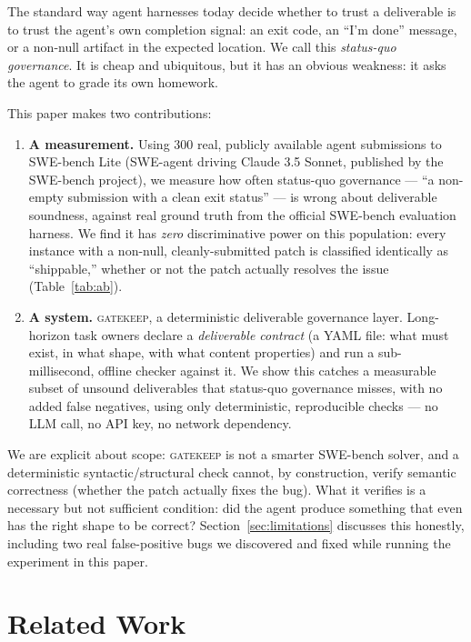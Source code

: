 \documentclass{article}
\begin{document}
The standard way agent harnesses today decide whether to trust a
deliverable is to trust the agent's own completion signal: an exit code,
an ``I'm done'' message, or a non-null artifact in the expected location.
We call this \emph{status-quo governance}. It is cheap and ubiquitous, but
it has an obvious weakness: it asks the agent to grade its own homework.

This paper makes two contributions:

\begin{enumerate}
  \item \textbf{A measurement.} Using 300 real, publicly available agent
  submissions to SWE-bench Lite (SWE-agent driving Claude 3.5 Sonnet,
  published by the SWE-bench project), we measure how often status-quo
  governance --- ``a non-empty submission with a clean exit status'' ---
  is wrong about deliverable soundness, against real ground truth from the
  official SWE-bench evaluation harness. We find it has \emph{zero}
  discriminative power on this population: every instance with a non-null,
  cleanly-submitted patch is classified identically as ``shippable,''
  whether or not the patch actually resolves the issue (Table~\ref{tab:ab}).

  \item \textbf{A system.} \textsc{gatekeep}, a deterministic deliverable
  governance layer. Long-horizon task owners declare a \emph{deliverable
  contract} (a YAML file: what must exist, in what shape, with what
  content properties) and run a sub-millisecond, offline checker against
  it. We show this catches a measurable subset of unsound deliverables
  that status-quo governance misses, with no added false negatives, using
  only deterministic, reproducible checks --- no LLM call, no API key, no
  network dependency.
\end{enumerate}

We are explicit about scope: \textsc{gatekeep} is not a smarter SWE-bench
solver, and a deterministic syntactic/structural check cannot, by
construction, verify semantic correctness (whether the patch actually
fixes the bug). What it verifies is a necessary but not sufficient
condition: did the agent produce something that even has the right shape
to be correct? Section~\ref{sec:limitations} discusses this honestly,
including two real false-positive bugs we discovered and fixed while
running the experiment in this paper.

\section{Related Work}
\end{document}
